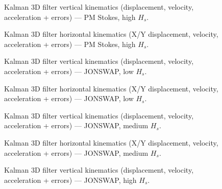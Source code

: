 \documentclass[11pt,letterpaper]{article}
\begin{document}
    \begin{figure}[H]\centering
    \resizebox{\textwidth}{!}{}
    \caption{Kalman 3D filter vertical kinematics (displacement, velocity, acceleration + errors) — PM Stokes, high $H_s$.}
    \label{fig:w3d_ou2_pmstokes_high_zkin}
    \end{figure}

    \begin{figure}[H]\centering
    \resizebox{\textwidth}{!}{}
    \caption{Kalman 3D filter horizontal kinematics (X/Y displacement, velocity, acceleration + errors) — PM Stokes, high $H_s$.}
    \label{fig:w3d_ou2_pmstokes_high_xykin}
    \end{figure}

    \begin{figure}[H]\centering
    \resizebox{\textwidth}{!}{}
    \caption{Kalman 3D filter vertical kinematics (displacement, velocity, acceleration + errors) — JONSWAP, low $H_s$.}
    \label{fig:w3d_ou2_jonswap_low_zkin}
    \end{figure}

    \begin{figure}[H]\centering
    \resizebox{\textwidth}{!}{}
    \caption{Kalman 3D filter horizontal kinematics (X/Y displacement, velocity, acceleration + errors) — JONSWAP, low $H_s$.}
    \label{fig:w3d_ou2_jonswap_low_xykin}
    \end{figure}

    \begin{figure}[H]\centering
    \resizebox{\textwidth}{!}{}
    \caption{Kalman 3D filter vertical kinematics (displacement, velocity, acceleration + errors) — JONSWAP, medium $H_s$.}
    \label{fig:w3d_ou2_jonswap_medium_zkin}
    \end{figure}

    \begin{figure}[H]\centering
    \resizebox{\textwidth}{!}{}
    \caption{Kalman 3D filter horizontal kinematics (X/Y displacement, velocity, acceleration + errors) — JONSWAP, medium $H_s$.}
    \label{fig:w3d_ou2_jonswap_medium_xykin}
    \end{figure}

    \begin{figure}[H]\centering
    \resizebox{\textwidth}{!}{}
    \caption{Kalman 3D filter vertical kinematics (displacement, velocity, acceleration + errors) — JONSWAP, high $H_s$.}
    \label{fig:w3d_ou2_jonswap_high_zkin}
    \end{figure}
\end{document}
